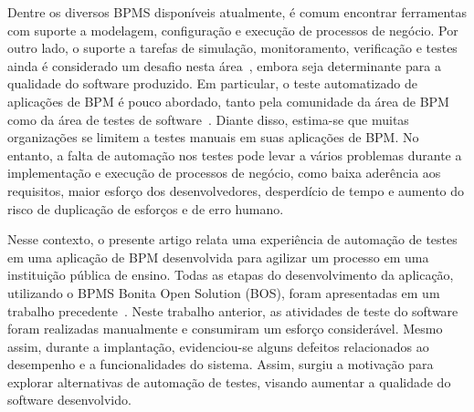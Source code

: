 \documentclass[12pt]{article}
\begin{document}
Dentre os diversos BPMS disponíveis atualmente, é comum encontrar ferramentas com suporte a modelagem, configuração e execução de processos de negócio. Por outro lado, o suporte a tarefas de simulação, monitoramento, verificação e testes ainda é considerado um desafio nesta área~\cite{aalst2013survey}, embora seja determinante para a qualidade do software produzido.  Em particular, o teste automatizado de aplicações de BPM é pouco abordado, tanto pela comunidade da área de BPM~\cite{aalst2013survey} como da área de testes de software~\cite{graham2012experiences}. Diante disso, estima-se que muitas organizações se limitem a testes manuais em suas aplicações de BPM. No entanto, a falta de automação nos testes pode levar a vários problemas durante a implementação e execução de processos de negócio, como baixa aderência aos requisitos, maior esforço dos desenvolvedores, desperdício de tempo e aumento do risco de duplicação de esforços e de erro humano.


Nesse contexto, o presente artigo relata uma experiência de automação de testes em uma aplicação de BPM desenvolvida para agilizar um processo em uma instituição pública de ensino. Todas as etapas do desenvolvimento da aplicação, utilizando o BPMS Bonita Open Solution (BOS), foram apresentadas em um trabalho precedente~\cite{sbsi2013}. 
Neste trabalho anterior, as atividades de teste do software foram realizadas manualmente e consumiram um esforço considerável. Mesmo assim, durante a implantação, evidenciou-se alguns defeitos relacionados ao desempenho e a funcionalidades do sistema. Assim, surgiu a motivação para explorar alternativas de automação de testes, visando aumentar a qualidade do software desenvolvido.
\end{document}
